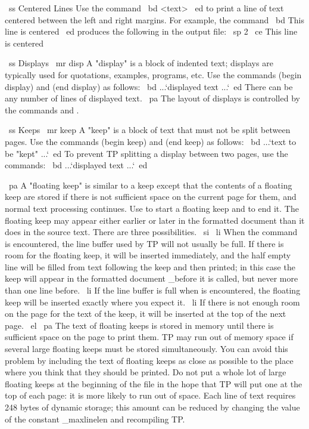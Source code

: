 ~ss Centered Lines
Use the command
~bd \CE <text> ~ed
to print a line of text centered between the left and right margins.
For example, the command
~bd \CE This line is centered ~ed
produces the following in the output file:
~sp 2 ~ce This line is centered

~ss Displays
~mr disp
A "display" is a block of indented text; displays are typically used for
quotations, examples, programs, etc.
Use the commands \BD (begin display) and \ED (end display) as follows:
~bd \BD ...`displayed text ...`\ED ~ed
There can be any number of lines of displayed text.
~pa The layout of displays is controlled by the commands \LS and \DL.

~ss Keeps
~mr keep
A "keep" is a block of text that must not be split between pages.
Use the commands \BK (begin keep) and \EK (end keep) as follows:
~bd \BK ...`text to be "kept" ...`\EK ~ed
To prevent TP splitting a display between two pages, use the commands:
~bd \BD \BK ...`displayed text ...`\EK \ED ~ed

~pa A "floating keep" is similar to a keep except that the contents
of a floating keep are stored if there is not sufficient space on
the current page for them, and normal text processing continues.
Use \BF to start a floating keep and \EF to end it.
The floating keep may appear either earlier or later in the formatted 
document than it does in the source text.
There are three possibilities.
~si
~li When the \BF command is encountered, the line buffer used by TP will
not usually be full.
If there is room for the floating keep, it will be inserted immediately,
and the half empty line will be filled from text following the keep and
then printed; in this case the keep will appear in the formatted document
_before it is called, but never more than one line before.
~li If the line buffer is full when \BF is encountered, the floating keep
will be inserted exactly where you expect it.
~li If there is not enough room on the page for the text of the keep, it
will be inserted at the top of the next page.
~el
~pa The text of floating keeps is stored in memory until there is sufficient
space on the page to print them.
TP may run out of memory space if several large floating keeps must be
stored simultaneously.
You can avoid this problem by including the text of floating keeps as close
as possible to the place where you think that they should be printed.
Do not put a whole lot of large floating keeps at the beginning of the
file in the hope that TP will put one at the top of each page: it is more
likely to run out of space.
Each line of text requires 248 bytes of dynamic storage; this amount can be
reduced by changing the value of the constant _maxlinelen and recompiling TP.

